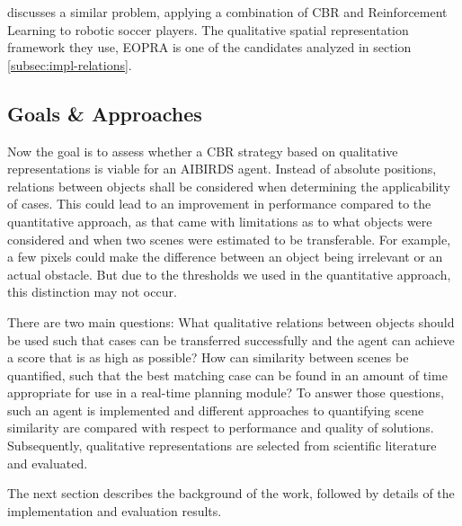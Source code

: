 \cite{QCBR} discusses a similar problem, applying a combination of \ac{CBR} and Reinforcement Learning to robotic soccer players.
The qualitative spatial representation framework they use, \ac{EOPRA} is one of the candidates analyzed in section \ref{subsec:impl-relations}.

\subsection{Goals \& Approaches}
Now the goal is to assess whether a \ac{CBR} strategy based on qualitative representations is viable for an AIBIRDS agent.
Instead of absolute positions, relations between objects shall be considered when determining the applicability of cases.
This could lead to an improvement in performance compared to the quantitative approach, as that came with limitations as to what objects were considered and when two scenes were estimated to be transferable. For example, a few pixels could make the difference between an object being irrelevant or an actual obstacle.
But due to the thresholds we used in the quantitative approach, this distinction may not occur.

There are two main questions: What qualitative relations between objects should be used such that cases can be transferred successfully and the agent can achieve a score that is as high as possible?
How can similarity between scenes be quantified, such that the best matching case can be found in an amount of time appropriate for use in a real-time planning module?
To answer those questions, such an agent is implemented and different approaches to quantifying scene similarity are compared with respect to performance and quality of solutions. Subsequently, qualitative representations are selected from scientific literature and evaluated.


The next section describes the background of the work, followed by details of the implementation and evaluation results.
